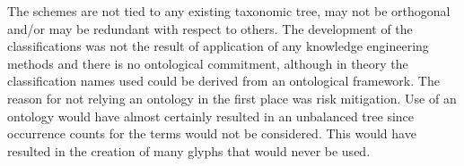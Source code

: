 \begin{table}[t]
\begin{center}
\vspace{1mm}
\end{center}
\caption{A fragment of the input document passed to the taxonomy generation algorithm. Schemes are grouped by common names preceding the semi-colon, \eg, \emph{S1:On Material} refers to schema 1 and \emph{On Material} is the classification.}
\label{table:input-fragment}
\vspace{-5mm}
\end{table}

The schemes are not tied to any existing taxonomic tree, may not be orthogonal and/or may be redundant with respect to others.
The development of the classifications was not the result of application of any knowledge engineering methods and there is no ontological commitment, although in theory the classification names used could be derived from an ontological framework.
The reason for not relying an ontology in the first place was risk mitigation.
Use of an ontology would have almost certainly resulted in an unbalanced tree since occurrence counts for the terms would not be considered.
This would have resulted in the creation of many glyphs that would never be used. 

